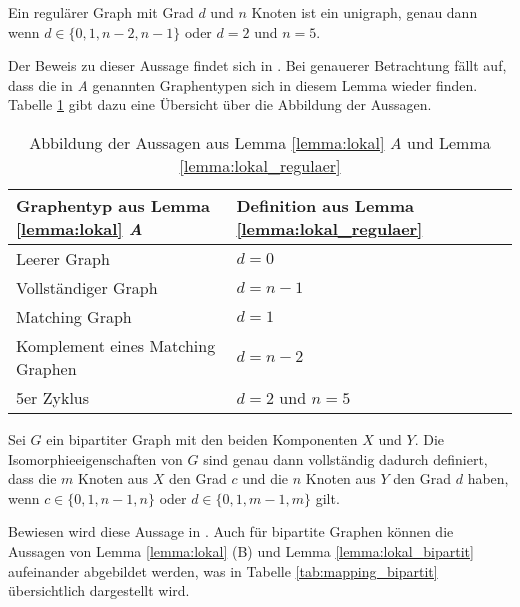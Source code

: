 \begin{Lemma}
	Ein regulärer Graph mit Grad $d$ und $n$ Knoten ist ein \gls{unigraph}, genau dann wenn $d\in \{0,1,n-2,n-1\}$ oder $d=2$ und $n=5$.
	\label{lemma:lokal_regulaer}
\end{Lemma}

Der Beweis zu dieser Aussage findet sich in \cite{johnson1975simple}.
Bei genauerer Betrachtung fällt auf, dass die in \emph{A} genannten Graphentypen sich in diesem Lemma wieder finden. Tabelle \ref{tab:mapping_regulaer} gibt dazu eine Übersicht über die Abbildung der Aussagen.

\begin{table}
	\centering
	\caption{Abbildung der Aussagen aus Lemma \ref{lemma:lokal} \emph{A} und Lemma \ref{lemma:lokal_regulaer}}
	\label{tab:mapping_regulaer}
	\begin{tabular}{|l|l|}
		\hline 
		Graphentyp aus Lemma \ref{lemma:lokal} \emph{A} & Definition aus Lemma \ref{lemma:lokal_regulaer} \\ 
		\hline 
		Leerer Graph & $d=0$ \\ 
		\hline 
		Vollständiger Graph & $d=n-1$ \\ 
		\hline 
		Matching Graph & $d=1$ \\ 
		\hline 
		Komplement eines Matching Graphen & $d=n-2$ \\ 
		\hline 
		5er Zyklus & $d=2$ und $n=5$ \\ 
		\hline 
	\end{tabular}
\end{table}

\begin{Lemma}
	Sei $G$ ein bipartiter Graph mit den beiden Komponenten $X$ und $Y$. 
	Die Isomorphieeigenschaften von $G$ sind genau dann vollständig dadurch definiert, dass die $m$ Knoten aus $X$ den Grad $c$ und die $n$ Knoten aus $Y$ den Grad $d$ haben, wenn $c\in \{0,1,n-1,n\}$ oder $d\in \{0,1,m-1,m\}$ gilt.
	\label{lemma:lokal_bipartit}
\end{Lemma}

Bewiesen wird diese Aussage in \cite{koren1976pairs}.
Auch für bipartite Graphen können die Aussagen von Lemma \ref{lemma:lokal} (B) und Lemma \ref{lemma:lokal_bipartit} aufeinander abgebildet werden, was in Tabelle \ref{tab:mapping_bipartit} übersichtlich dargestellt wird. \\

